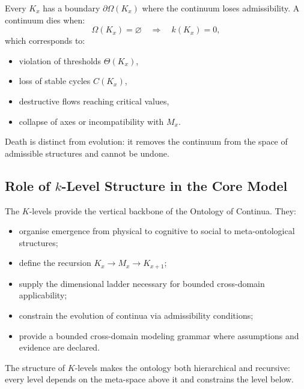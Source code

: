 Every $K_x$ has a boundary $\partial\Omega(K_x)$ where the
continuum loses admissibility.
A continuum dies when:
\[
\Omega(K_x) = \varnothing
\quad\Rightarrow\quad
k(K_x) = 0,
\]
which corresponds to:
\begin{itemize}
    \item violation of thresholds $\Theta(K_x)$,
    \item loss of stable cycles $C(K_x)$,
    \item destructive flows reaching critical values,
    \item collapse of axes or incompatibility with $M_x$.
\end{itemize}

Death is distinct from evolution: it removes the continuum from the
space of admissible structures and cannot be undone.


\subsection{Role of \texorpdfstring{$k$}{k}-Level Structure in the Core Model}

The $K$-levels provide the vertical backbone of the Ontology of
Continua.
They:
\begin{itemize}
    \item organise emergence from physical to cognitive to social to
          meta-ontological structures;
    \item define the recursion $K_x \to M_x \to K_{x+1}$;
    \item supply the dimensional ladder necessary for bounded cross-domain applicability;
    \item constrain the evolution of continua via admissibility
          conditions;
    \item provide a bounded cross-domain modeling grammar where assumptions and evidence are declared.
\end{itemize}

The structure of $K$-levels makes the ontology both hierarchical and
recursive: every level depends on the meta-space above it and constrains
the level below.
